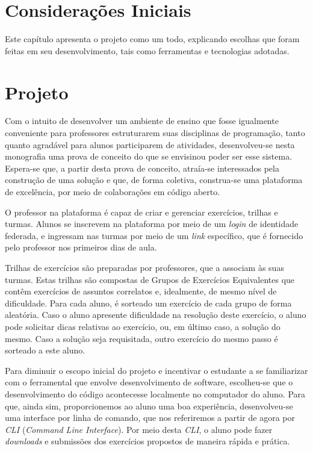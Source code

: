 \section{Considerações Iniciais}
Este capítulo apresenta o projeto como um todo, explicando escolhas que foram 
feitas em seu desenvolvimento, tais como ferramentas e tecnologias adotadas. 
 


\section{Projeto}
Com o intuito de desenvolver um ambiente de ensino que fosse igualmente conveniente 
para professores estruturarem suas disciplinas de programação, 
tanto quanto agradável para alunos participarem de atividades, desenvolveu-se nesta monografia
 uma prova de conceito do que se envisinou poder ser esse sistema. Espera-se que, a partir 
 desta prova de conceito, atraía-se interessados pela construção de uma solução e 
 que, de forma coletiva, construa-se uma plataforma de excelência,
 por meio de colaborações em código aberto.

O professor na plataforma é capaz de criar e gerenciar exercícios, trilhas e turmas. 
Alunos se inscrevem na plataforma por meio de um \emph{login} de identidade federada, e 
ingressam nas turmas por meio de um \emph{link} específico, que é fornecido 
pelo professor nos primeiros dias de aula. 

Trilhas de exercícios são preparadas por professores, que a associam às suas turmas. 
Estas trilhas são compostas de Grupos de Exercícios Equivalentes que 
contêm exercícios de assuntos correlatos e, idealmente, de mesmo nível de dificuldade.
Para cada aluno, é sorteado um exercício de cada grupo de forma aleatória. 
Caso o aluno apresente dificuldade na resolução deste exercício, o aluno pode solicitar 
dicas relativas ao exercício, ou, em último caso, a solução do mesmo. Caso a solução 
seja requisitada, outro exercício do mesmo passo é sorteado a este aluno.

Para diminuir o escopo inicial do projeto e incentivar o estudante a se familiarizar com o ferramental 
que envolve desenvolvimento de software, escolheu-se que o desenvolvimento do código 
acontecesse localmente no computador do aluno. Para que, ainda sim, proporcionemos ao aluno 
uma boa experiência, desenvolveu-se uma interface por linha de comando, que nos referiremos a partir de agora 
por \emph{CLI} (\emph{Command Line Interface}). Por meio desta \emph{CLI},
o aluno pode fazer \emph{downloads} e submissões
dos exercícios propostos de maneira rápida e prática.

